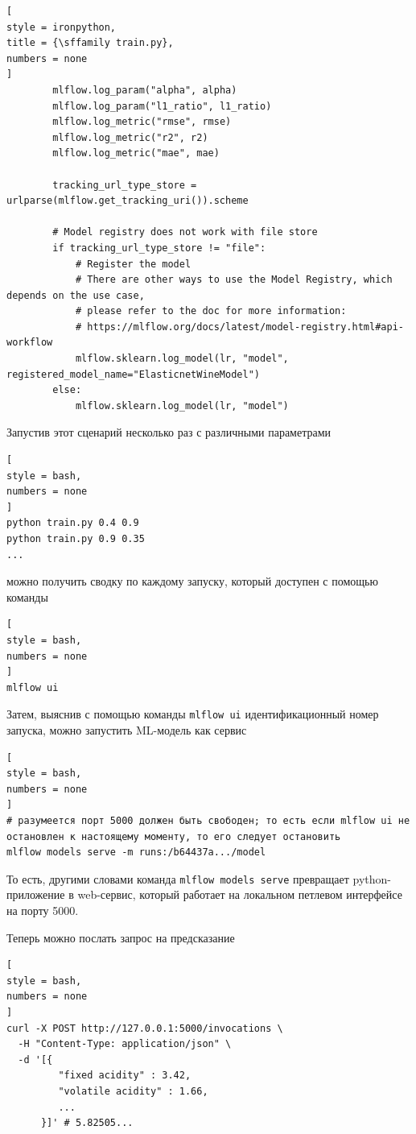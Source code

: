 \documentclass[%
	11pt,
	a4paper,
	utf8,
		]{article}
\begin{document}
\begin{lstlisting}[
style = ironpython,
title = {\sffamily train.py},
numbers = none	
]
        mlflow.log_param("alpha", alpha)
        mlflow.log_param("l1_ratio", l1_ratio)
        mlflow.log_metric("rmse", rmse)
        mlflow.log_metric("r2", r2)
        mlflow.log_metric("mae", mae)

        tracking_url_type_store = urlparse(mlflow.get_tracking_uri()).scheme

        # Model registry does not work with file store
        if tracking_url_type_store != "file":
            # Register the model
            # There are other ways to use the Model Registry, which depends on the use case,
            # please refer to the doc for more information:
            # https://mlflow.org/docs/latest/model-registry.html#api-workflow
            mlflow.sklearn.log_model(lr, "model", registered_model_name="ElasticnetWineModel")
        else:
            mlflow.sklearn.log_model(lr, "model")
\end{lstlisting}

Запустив этот сценарий несколько раз с различными параметрами
\begin{lstlisting}[
style = bash,
numbers = none	
]
python train.py 0.4 0.9
python train.py 0.9 0.35
...
\end{lstlisting}
можно получить сводку по каждому запуску, который доступен с помощью команды
\begin{lstlisting}[
style = bash,
numbers = none	
]
mlflow ui
\end{lstlisting}

Затем, выяснив с помощью команды \texttt{mlflow ui} идентификационный номер запуска, можно запустить ML-модель как сервис
\begin{lstlisting}[
style = bash,
numbers = none	
]
# разумеется порт 5000 должен быть свободен; то есть если mlflow ui не остановлен к настоящему моменту, то его следует остановить
mlflow models serve -m runs:/b64437a.../model
\end{lstlisting}

То есть, другими словами команда \texttt{mlflow models serve} превращает python-приложение в web-сервис, который работает на локальном петлевом интерфейсе на порту 5000.

Теперь можно послать запрос на предсказание
\begin{lstlisting}[
style = bash,
numbers = none	
]
curl -X POST http://127.0.0.1:5000/invocations \
  -H "Content-Type: application/json" \
  -d '[{
         "fixed acidity" : 3.42,
         "volatile acidity" : 1.66,
         ...
      }]' # 5.82505...
\end{lstlisting}
\end{document}
